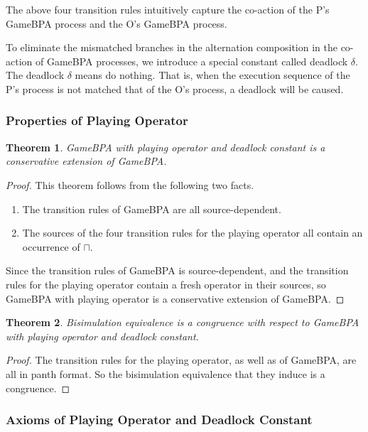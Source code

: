 \documentclass{fac}
\newtheorem{theorem}{Theorem}[section]
\begin{document}
The above four transition rules intuitively capture the co-action of the P's GameBPA process and the O's GameBPA process.

To eliminate the mismatched branches in the alternation composition in the co-action of GameBPA processes, we introduce a special constant called deadlock $\delta$. The deadlock $\delta$ means do nothing. That is, when the execution sequence of the P's process is not matched that of the O's process, a deadlock will be caused.

\subsubsection{Properties of Playing Operator}

\begin{theorem}
GameBPA with playing operator and deadlock constant is a conservative extension of GameBPA.
\end{theorem}

\begin{proof}
This theorem follows from the following two facts.

\begin{enumerate}
  \item The transition rules of GameBPA are all source-dependent.
  \item The sources of the four transition rules for the playing operator all contain an occurrence of $\sqcap$.
\end{enumerate}

Since the transition rules of GameBPA is source-dependent, and the transition rules for the playing operator contain a fresh operator in their
sources, so GameBPA with playing operator is a conservative extension of GameBPA.
\end{proof}

\begin{theorem}
Bisimulation equivalence is a congruence with respect to GameBPA with playing operator and deadlock constant.
\end{theorem}

\begin{proof}
The transition rules for the playing operator, as well as of GameBPA, are all in panth format. So the bisimulation equivalence that they induce is a congruence.
\end{proof}

\subsubsection{Axioms of Playing Operator and Deadlock Constant}
\end{document}
